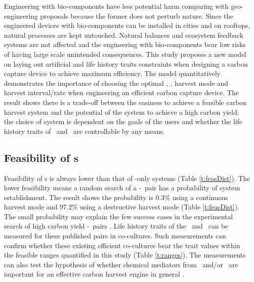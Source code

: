\documentclass[../thesis.tex]{subfiles} %
\begin{document}
Engineering with bio-components have less potential harm comparing with geo-engineering proposals because the former does not perturb nature.  Since the engineered devices with bio-components can be installed in cities and on rooftops, natural processes are kept untouched.  Natural balances and ecosystem feedback systems are not affected and the engineering with bio-components bear low risks of having large scale unintended consequences.  This study proposes a new model on laying out artificial and life history traits constraints when designing a carbon capture device to achieve maximum efficiency.  The model quantitatively demonstrates the importance of choosing the optimal \phy, \bac, harvest mode and harvest interval/rate when engineering an efficient carbon capture device.  The result shows there is a trade-off between the easiness to achieve a feasible carbon harvest system and the potential of the system to achieve a high carbon yield; the choice of system is dependent on the goals of the users and whether the life history traits of \phy\ and \bac\ are controllable by any means.

\subsection{Feasibility of \pbs s}
Feasibility of \pbs s is always lower than that of \phy-only systems (Table \ref{t:feasDist}).  The lower feasibility means a random search of a \phy-\bac\ pair has a probability of system establishment.  The result shows the probability is 0.3\% using a continuous harvest mode and 97.2\% using a destructive harvest mode (Table \ref{t:feasDist}).  The small probability may explain the few success cases in the experimental search of high carbon yield \phy-\bac\ pairs \autocite{fuentes2016impact}.  Life history traits of the \phy\ and \bac\ can be measured for these published pairs in co-cultures.  Such measurements can confirm whether these existing efficient co-cultures bear the trait values within the feasible ranges quantified in this study (Table \ref{t:ranges}).  The measurements can also test the hypothesis of whether chemical mediators from \phy\ and/or \bac\ are important for an effective carbon harvest engine in general \autocite{rivas2010interactions,amin2009photolysis,fuentes2016impact}.
\end{document}
